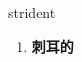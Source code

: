 
\begin{frame}
{\huge strident}
\begin{center}
\begin{enumerate}\Large
  \item \textbf{刺耳的}
\end{enumerate}
\end{center}
\end{frame}
